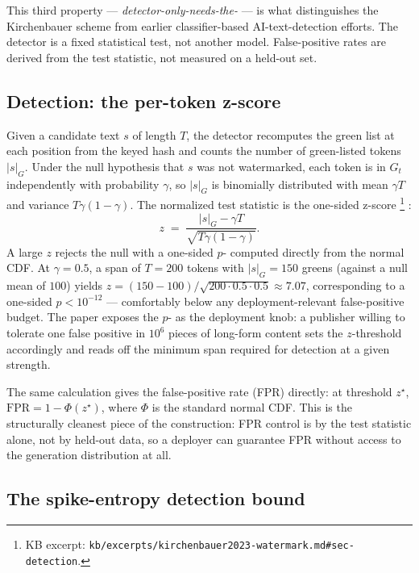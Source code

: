 This third property --- \emph{detector-only-needs-the-} --- is what
distinguishes the Kirchenbauer scheme from earlier classifier-based
AI-text-detection efforts. The detector is a fixed statistical test,
not another model. False-positive rates are derived from the test
statistic, not measured on a held-out set.

\subsection{Detection: the per-token z-score}
\label{sec:watermarking-detection}

Given a candidate text $s$ of length $T$, the detector recomputes the
green list at each position from the keyed hash and counts the number
of green-listed tokens $|s|_G$. Under the null hypothesis that $s$ was
not watermarked, each token is in $G_t$ independently with probability
$\gamma$, so $|s|_G$ is binomially distributed with mean $\gamma T$ and
variance $T \gamma (1 - \gamma)$. The normalized test statistic is the
one-sided z-score%
\footnote{KB excerpt: \nolinkurl{kb/excerpts/kirchenbauer2023-watermark.md#sec-detection}.}
\citep[\S{}sec-detection]{kirchenbauer2023-watermark}:
\[
z \;=\; \frac{|s|_G - \gamma T}{\sqrt{T \gamma (1 - \gamma)}}.
\]
A large $z$ rejects the null with a one-sided $p$- computed
directly from the normal CDF. At $\gamma = 0.5$, a span of $T = 200$
tokens with $|s|_G = 150$ greens (against a null mean of $100$) yields
$z = (150 - 100)/\sqrt{200 \cdot 0.5 \cdot 0.5} \approx 7.07$,
corresponding to a one-sided $p < 10^{-12}$ --- comfortably below any
deployment-relevant false-positive budget. The paper exposes the
$p$- as the deployment knob: a publisher willing to tolerate one
false positive in $10^6$ pieces of long-form content sets the
$z$-threshold accordingly and reads off the minimum span required for
detection at a given  strength.

The same calculation gives the false-positive rate (FPR) directly: at
threshold $z^\star$, $\mathrm{FPR} = 1 - \Phi(z^\star)$, where $\Phi$
is the standard normal CDF. This is the structurally cleanest piece of
the construction: FPR control is by the test statistic alone, not by
held-out data, so a deployer can guarantee FPR without access to the
generation distribution at all.

\subsection{The spike-entropy detection bound}
\label{sec:watermarking-spike-entropy}

